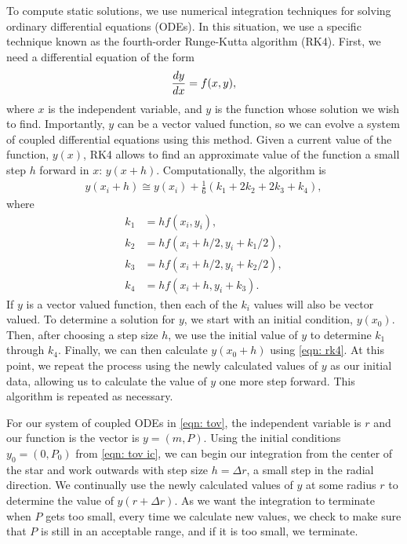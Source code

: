 To compute static solutions, we use numerical integration techniques for solving ordinary differential equations (ODEs). In this situation, we use a specific technique known as the fourth-order Runge-Kutta algorithm (RK4). First, we need a differential equation of the form
\[\dv{y}{x} = f(x, y),\]
where $x$ is the independent variable, and $y$ is the function whose solution we wish to find. Importantly, $y$ can be a vector valued function, so we can evolve a system of coupled differential equations using this method. Given a current value of the function, $y(x)$, RK4 allows to find an approximate value of the function a small step $h$ forward in $x$: $y(x+h)$. Computationally, the algorithm is
\begin{align}\label{eqn: rk4}
    y(x_i+h) \cong y(x_i) + \frac{1}{6}(k_1 + 2k_2 + 2k_3 + k_4),
\end{align}
where
\begin{align}
    k_1 & = h f(x_i, y_i),\nonumber\\
    k_2 & = h f(x_i+h/2, y_i+k_1/2),\nonumber\\
    k_3 & = h f(x_i+h/2, y_i+k_2/2),\nonumber\\
    k_4 & = h f(x_i +h, y_i + k_3).\nonumber
\end{align}
If $y$ is a vector valued function, then each of the $k_i$ values will also be vector valued. To determine a solution for $y$, we start with an initial condition, $y(x_0)$. Then, after choosing a step size $h$, we use the initial value of $y$ to determine $k_1$ through $k_4$. Finally, we can then calculate $y(x_0+h)$ using \eqref{eqn: rk4}. At this point, we repeat the process using the newly calculated values of $y$ as our initial data, allowing us to calculate the value of $y$ one more step forward. This algorithm is repeated as necessary.

For our system of coupled ODEs in \eqref{eqn: tov}, the independent variable is $r$ and our function is the vector is $y = (m, P)$. Using the initial conditions $y_0 = (0, P_0)$ from \eqref{eqn: tov ic}, we can begin our integration from the center of the star and work outwards with step size $h = \Delta r$, a small step in the radial direction. We continually use the newly calculated values of $y$ at some radius $r$ to determine the value of $y(r+\Delta r)$. As we want the integration to terminate when $P$ gets too small, every time we calculate new values, we check to make sure that $P$ is still in an acceptable range, and if it is too small, we terminate.


